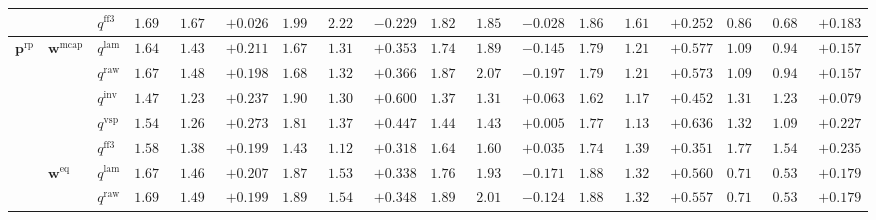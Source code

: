 \documentclass{article}
\begin{document}
\begin{table}[!htbp]
{\begin{tabular}{lll ccc ccc ccc ccc ccc}
 &  & $q^{\mathrm{ff3}}$ & $1.697$ & $1.671$ & \cellcolor{posgreen!50}$+0.026$ & $1.999$ & $2.228$ & \cellcolor{negred!50}$-0.229$ & $1.828$ & $1.856$ & \cellcolor{negred!50}$-0.028$ & $1.867$ & $1.615$ & \cellcolor{posgreen!50}$+0.252$ & $0.868$ & $0.685$ & \cellcolor{posgreen!50}$+0.183$ \\
\midrule
$\mathbf{p}^{\mathrm{rp}}$ & $\mathbf{w}^{\mathrm{mcap}}$ & $q^{\mathrm{lam}}$ & $1.644$ & $1.432$ & \cellcolor{posgreen!50}$+0.211$ & $1.672$ & $1.319$ & \cellcolor{posgreen!50}$+0.353$ & $1.746$ & $1.891$ & \cellcolor{negred!50}$-0.145$ & $1.794$ & $1.216$ & \cellcolor{posgreen!50}$+0.577$ & $1.099$ & $0.942$ & \cellcolor{posgreen!50}$+0.157$ \\
 &  & $q^{\mathrm{raw}}$ & $1.679$ & $1.481$ & \cellcolor{posgreen!50}$+0.198$ & $1.687$ & $1.321$ & \cellcolor{posgreen!50}$+0.366$ & $1.873$ & $2.070$ & \cellcolor{negred!50}$-0.197$ & $1.790$ & $1.218$ & \cellcolor{posgreen!50}$+0.573$ & $1.099$ & $0.942$ & \cellcolor{posgreen!50}$+0.157$ \\
 &  & $q^{\mathrm{inv}}$ & $1.476$ & $1.239$ & \cellcolor{posgreen!50}$+0.237$ & $1.906$ & $1.306$ & \cellcolor{posgreen!50}$+0.600$ & $1.377$ & $1.314$ & \cellcolor{posgreen!50}$+0.063$ & $1.629$ & $1.177$ & \cellcolor{posgreen!50}$+0.452$ & $1.312$ & $1.233$ & \cellcolor{posgreen!50}$+0.079$ \\
 &  & $q^{\mathrm{vsp}}$ & $1.540$ & $1.268$ & \cellcolor{posgreen!50}$+0.273$ & $1.818$ & $1.371$ & \cellcolor{posgreen!50}$+0.447$ & $1.441$ & $1.436$ & \cellcolor{posgreen!50}$+0.005$ & $1.771$ & $1.134$ & \cellcolor{posgreen!50}$+0.636$ & $1.320$ & $1.093$ & \cellcolor{posgreen!50}$+0.227$ \\
 &  & $q^{\mathrm{ff3}}$ & $1.586$ & $1.386$ & \cellcolor{posgreen!50}$+0.199$ & $1.438$ & $1.120$ & \cellcolor{posgreen!50}$+0.318$ & $1.643$ & $1.608$ & \cellcolor{posgreen!50}$+0.035$ & $1.749$ & $1.398$ & \cellcolor{posgreen!50}$+0.351$ & $1.779$ & $1.545$ & \cellcolor{posgreen!50}$+0.235$ \\
\cmidrule(lr){2-18}
 & $\mathbf{w}^{\mathrm{eq}}$ & $q^{\mathrm{lam}}$ & $1.672$ & $1.465$ & \cellcolor{posgreen!50}$+0.207$ & $1.876$ & $1.538$ & \cellcolor{posgreen!50}$+0.338$ & $1.764$ & $1.935$ & \cellcolor{negred!50}$-0.171$ & $1.883$ & $1.324$ & \cellcolor{posgreen!50}$+0.560$ & $0.715$ & $0.536$ & \cellcolor{posgreen!50}$+0.179$ \\
 &  & $q^{\mathrm{raw}}$ & $1.692$ & $1.493$ & \cellcolor{posgreen!50}$+0.199$ & $1.895$ & $1.547$ & \cellcolor{posgreen!50}$+0.348$ & $1.894$ & $2.019$ & \cellcolor{negred!50}$-0.124$ & $1.881$ & $1.324$ & \cellcolor{posgreen!50}$+0.557$ & $0.715$ & $0.536$ & \cellcolor{posgreen!50}$+0.179$ \\

\end{tabular}}
\end{table}
\end{document}
